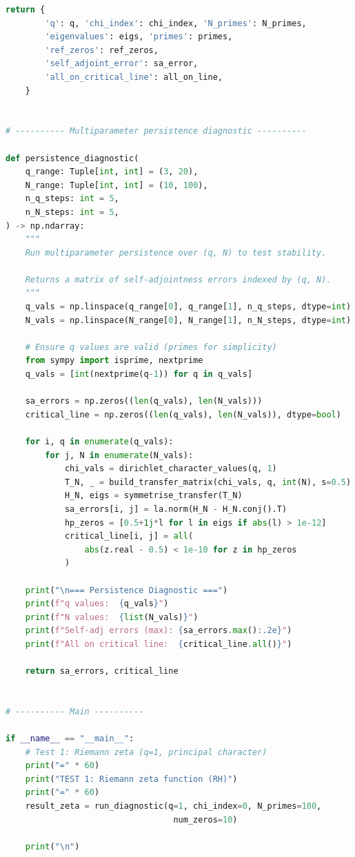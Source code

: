 \documentclass[11pt,oneside]{amsbook}
\numberwithin{equation}{section}
\theoremstyle{plain}
\theoremstyle{definition}
\theoremstyle{remark}
\begin{document}
\begin{lstlisting}[language=Python,caption={Minimal HP--GRH test pipeline (Python~3.10+, NumPy, SciPy, mpmath).},label=lst:hp_grh_pipeline]
    return {
        'q': q, 'chi_index': chi_index, 'N_primes': N_primes,
        'eigenvalues': eigs, 'primes': primes,
        'ref_zeros': ref_zeros,
        'self_adjoint_error': sa_error,
        'all_on_critical_line': all_on_line,
    }


# ---------- Multiparameter persistence diagnostic ----------

def persistence_diagnostic(
    q_range: Tuple[int, int] = (3, 20),
    N_range: Tuple[int, int] = (10, 100),
    n_q_steps: int = 5,
    n_N_steps: int = 5,
) -> np.ndarray:
    """
    Run multiparameter persistence over (q, N) to test stability.

    Returns a matrix of self-adjointness errors indexed by (q, N).
    """
    q_vals = np.linspace(q_range[0], q_range[1], n_q_steps, dtype=int)
    N_vals = np.linspace(N_range[0], N_range[1], n_N_steps, dtype=int)

    # Ensure q values are valid (primes for simplicity)
    from sympy import isprime, nextprime
    q_vals = [int(nextprime(q-1)) for q in q_vals]

    sa_errors = np.zeros((len(q_vals), len(N_vals)))
    critical_line = np.zeros((len(q_vals), len(N_vals)), dtype=bool)

    for i, q in enumerate(q_vals):
        for j, N in enumerate(N_vals):
            chi_vals = dirichlet_character_values(q, 1)
            T_N, _ = build_transfer_matrix(chi_vals, q, int(N), s=0.5)
            H_N, eigs = symmetrise_transfer(T_N)
            sa_errors[i, j] = la.norm(H_N - H_N.conj().T)
            hp_zeros = [0.5+1j*l for l in eigs if abs(l) > 1e-12]
            critical_line[i, j] = all(
                abs(z.real - 0.5) < 1e-10 for z in hp_zeros
            )

    print("\n=== Persistence Diagnostic ===")
    print(f"q values:  {q_vals}")
    print(f"N values:  {list(N_vals)}")
    print(f"Self-adj errors (max): {sa_errors.max():.2e}")
    print(f"All on critical line:  {critical_line.all()}")

    return sa_errors, critical_line


# ---------- Main ----------

if __name__ == "__main__":
    # Test 1: Riemann zeta (q=1, principal character)
    print("=" * 60)
    print("TEST 1: Riemann zeta function (RH)")
    print("=" * 60)
    result_zeta = run_diagnostic(q=1, chi_index=0, N_primes=100,
                                  num_zeros=10)

    print("\n")


\end{lstlisting}
\end{document}
